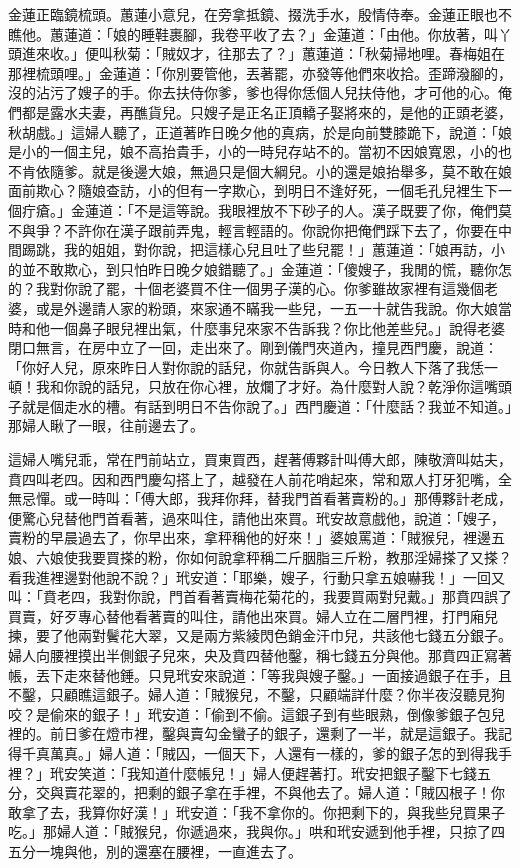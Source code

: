金蓮正臨鏡梳頭。蕙蓮小意兒，在旁拿抵鏡、掇洗手水，殷情侍奉。金蓮正眼也不瞧他。蕙蓮道：「娘的睡鞋裹腳，我卷平收了去？」金蓮道：「由他。你放著，叫丫頭進來收。」便叫秋菊：「賊奴才，往那去了？」蕙蓮道：「秋菊掃地哩。春梅姐在那裡梳頭哩。」金蓮道：「你別要管他，丟著罷，亦發等他們來收拾。歪蹄潑腳的，沒的沾污了嫂子的手。你去扶侍你爹，爹也得你恁個人兒扶侍他，才可他的心。俺們都是露水夫妻，再醮貨兒。只嫂子是正名正頂轎子娶將來的，是他的正頭老婆，秋胡戲。」這婦人聽了，正道著昨日晚夕他的真病，於是向前雙膝跪下，說道：「娘是小的一個主兒，娘不高抬貴手，小的一時兒存站不的。當初不因娘寬恩，小的也不肯依隨爹。就是後邊大娘，無過只是個大綱兒。小的還是娘抬舉多，莫不敢在娘面前欺心？隨娘查訪，小的但有一字欺心，到明日不逢好死，一個毛孔兒裡生下一個疔瘡。」金蓮道：「不是這等說。我眼裡放不下砂子的人。漢子既要了你，俺們莫不與爭？不許你在漢子跟前弄鬼，輕言輕語的。你說你把俺們踩下去了，你要在中間踢跳，我的姐姐，對你說，把這樣心兒且吐了些兒罷！」蕙蓮道：「娘再訪，小的並不敢欺心，到只怕昨日晚夕娘錯聽了。」金蓮道：「傻嫂子，我閒的慌，聽你怎的？我對你說了罷，十個老婆買不住一個男子漢的心。你爹雖故家裡有這幾個老婆，或是外邊請人家的粉頭，來家通不瞞我一些兒，一五一十就告我說。你大娘當時和他一個鼻子眼兒裡出氣，什麼事兒來家不告訴我？你比他差些兒。」說得老婆閉口無言，在房中立了一回，走出來了。剛到儀門夾道內，撞見西門慶，說道：「你好人兒，原來昨日人對你說的話兒，你就告訴與人。今日教人下落了我恁一頓！我和你說的話兒，只放在你心裡，放爛了才好。為什麼對人說？乾淨你這嘴頭子就是個走水的槽。有話到明日不告你說了。」西門慶道：「什麼話？我並不知道。」那婦人瞅了一眼，往前邊去了。

這婦人嘴兒乖，常在門前站立，買東買西，趕著傅夥計叫傅大郎，陳敬濟叫姑夫，賁四叫老四。因和西門慶勾搭上了，越發在人前花哨起來，常和眾人打牙犯嘴，全無忌憚。或一時叫：「傅大郎，我拜你拜，替我門首看著賣粉的。」那傅夥計老成，便驚心兒替他門首看著，過來叫住，請他出來買。玳安故意戲他，說道：「嫂子，賣粉的早晨過去了，你早出來，拿秤稱他的好來！」婆娘罵道：「賊猴兒，裡邊五娘、六娘使我要買搽的粉，你如何說拿秤稱二斤胭脂三斤粉，教那淫婦搽了又搽？看我進裡邊對他說不說？」玳安道：「耶樂，嫂子，行動只拿五娘嚇我！」一回又叫：「賁老四，我對你說，門首看著賣梅花菊花的，我要買兩對兒戴。」那賁四誤了買賣，好歹專心替他看著賣的叫住，請他出來買。婦人立在二層門裡，打門廂兒揀，要了他兩對鬢花大翠，又是兩方紫綾閃色銷金汗巾兒，共該他七錢五分銀子。婦人向腰裡摸出半側銀子兒來，央及賁四替他鑿，稱七錢五分與他。那賁四正寫著帳，丟下走來替他錘。只見玳安來說道：「等我與嫂子鑿。」一面接過銀子在手，且不鑿，只顧瞧這銀子。婦人道：「賊猴兒，不鑿，只顧端詳什麼？你半夜沒聽見狗咬？是偷來的銀子！」玳安道：「偷到不偷。這銀子到有些眼熟，倒像爹銀子包兒裡的。前日爹在燈市裡，鑿與賣勾金蠻子的銀子，還剩了一半，就是這銀子。我記得千真萬真。」婦人道：「賊囚，一個天下，人還有一樣的，爹的銀子怎的到得我手裡？」玳安笑道：「我知道什麼帳兒！」婦人便趕著打。玳安把銀子鑿下七錢五分，交與賣花翠的，把剩的銀子拿在手裡，不與他去了。婦人道：「賊囚根子！你敢拿了去，我算你好漢！」玳安道：「我不拿你的。你把剩下的，與我些兒買果子吃。」那婦人道：「賊猴兒，你遞過來，我與你。」哄和玳安遞到他手裡，只掠了四五分一塊與他，別的還塞在腰裡，一直進去了。


